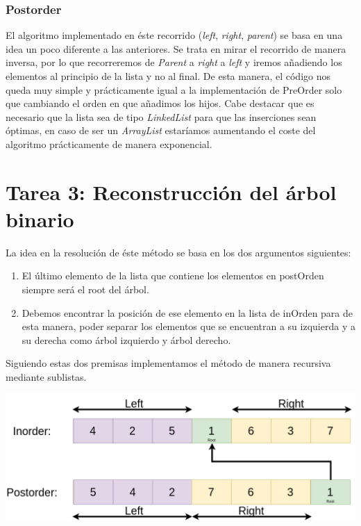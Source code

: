 \documentclass{article}
\begin{document}
        \subsubsection{Postorder}
        El algoritmo implementado en éste recorrido (\textit{left}, \textit{right}, \textit{parent})
        se basa en una idea un poco diferente a las anteriores.\newline
        Se trata en mirar el recorrido de manera inversa, por lo que recorreremos de \textit{Parent} a \textit{right} a \textit{left} y iremos añadiendo los elementos al principio de la lista y no al final. De esta manera, el código nos queda muy simple y prácticamente igual a la implementación de PreOrder solo que cambiando el orden en que añadimos los hijos.  \newline
        Cabe destacar que es necesario que la lista sea de tipo \textit{LinkedList} para que las inserciones sean óptimas, en caso de ser un \textit{ArrayList} estaríamos aumentando el coste del algoritmo prácticamente de manera exponencial.
        

\section{Tarea 3: Reconstrucción del árbol binario}
La idea en la resolución de éste método se basa en los dos argumentos siguientes:
\begin{enumerate}
    \item El último elemento de la lista que contiene los elementos en postOrden siempre será el root del árbol.
    \item Debemos encontrar la posición de ese elemento en la lista de inOrden para de esta manera, poder separar los elementos que se encuentran a su izquierda y a su derecha como árbol izquierdo y árbol derecho.
\end{enumerate}
Siguiendo estas dos premisas implementamos el método de manera recursiva mediante sublistas.
\begin{centering}
\includegraphics[scale=0.36]{Diagram.png}
\end{centering}
\end{document}
